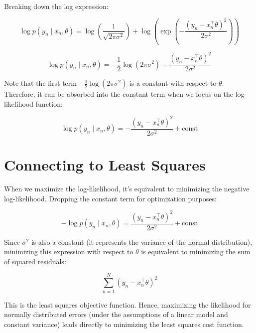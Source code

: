 \documentclass{article}
\begin{document}
Breaking down the log expression:

\[
\log p(y_n \mid x_n, \theta) = \log \left( \frac{1}{\sqrt{2\pi\sigma^2}} \right) + \log \left( \exp\left( -\frac{(y_n - x_n^\top \theta)^2}{2\sigma^2} \right) \right)
\]

\[
\log p(y_n \mid x_n, \theta) = -\frac{1}{2} \log (2\pi\sigma^2) - \frac{(y_n - x_n^\top \theta)^2}{2\sigma^2}
\]

Note that the first term \(-\frac{1}{2} \log (2\pi\sigma^2)\) is a constant with respect to \(\theta\). Therefore, it can be absorbed into the constant term when we focus on the log-likelihood function:

\[
\log p(y_n \mid x_n, \theta) = -\frac{(y_n - x_n^\top \theta)^2}{2\sigma^2} + \text{const}
\]

\section*{Connecting to Least Squares}

When we maximize the log-likelihood, it's equivalent to minimizing the negative log-likelihood. Dropping the constant term for optimization purposes:

\[
-\log p(y_n \mid x_n, \theta) = \frac{(y_n - x_n^\top \theta)^2}{2\sigma^2} + \text{const}
\]

Since \(\sigma^2\) is also a constant (it represents the variance of the normal distribution), minimizing this expression with respect to \(\theta\) is equivalent to minimizing the sum of squared residuals:

\[
\sum_{n=1}^N (y_n - x_n^\top \theta)^2
\]

This is the least squares objective function. Hence, maximizing the likelihood for normally distributed errors (under the assumptions of a linear model and constant variance) leads directly to minimizing the least squares cost function.
\end{document}
